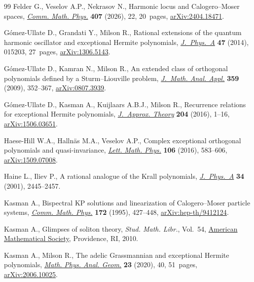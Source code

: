 \begin{thebibliography}{99}
Felder G., Veselov A.P., Nekrasov N., Harmonic locus and {C}alogero--{M}oser
 spaces, \href{https://doi.org/10.1007/s00220-025-05522-z}{\textit{Comm. Math.
 Phys.}} \textbf{407} (2026), 22, 20~pages,
 \href{http://arxiv.org/abs/2404.18471}{arXiv:2404.18471}.

G\'omez-Ullate D., Grandati Y., Milson R., Rational extensions of the quantum
 harmonic oscillator and exceptional {H}ermite polynomials,
 \href{https://doi.org/10.1088/1751-8113/47/1/015203}{\textit{J.~Phys.~A}}
 \textbf{47} (2014), 015203, 27~pages,
 \href{http://arxiv.org/abs/1306.5143}{arXiv:1306.5143}.

G\'omez-Ullate D., Kamran N., Milson R., An extended class of orthogonal
 polynomials defined by a {S}turm--{L}iouville problem,
 \href{https://doi.org/10.1016/j.jmaa.2009.05.052}{\textit{J.~Math. Anal.
 Appl.}} \textbf{359} (2009), 352--367,
 \href{http://arxiv.org/abs/0807.3939}{arXiv:0807.3939}.

G\'omez-Ullate D., Kasman A., Kuijlaars A.B.J., Milson R., Recurrence relations
 for exceptional {H}ermite polynomials,
 \href{https://doi.org/10.1016/j.jat.2015.12.003}{\textit{J.~Approx. Theory}}
 \textbf{204} (2016), 1--16,
 \href{http://arxiv.org/abs/1506.03651}{arXiv:1506.03651}.

Haese-Hill W.A., Halln\"as M.A., Veselov A.P., Complex exceptional orthogonal
 polynomials and quasi-invariance,
 \href{https://doi.org/10.1007/s11005-016-0828-8}{\textit{Lett. Math. Phys.}}
 \textbf{106} (2016), 583--606,
 \href{http://arxiv.org/abs/1509.07008}{arXiv:1509.07008}.

Haine L., Iliev P., A rational analogue of the {K}rall polynomials,
\href{https://doi.org/10.1088/0305-4470/34/11/333}{\textit{J.~Phys.~A}} \textbf{34} (2001), 2445--2457.

Kasman A., Bispectral {KP} solutions and linearization of {C}alogero--{M}oser
 particle systems, \href{https://doi.org/10.1007/BF02099435}{\textit{Comm.
 Math. Phys.}} \textbf{172} (1995), 427--448,
 \href{http://arxiv.org/abs/hep-th/9412124}{arXiv:hep-th/9412124}.

Kasman A., Glimpses of soliton theory, \textit{Stud. Math. Libr.}, Vol.~54,
 \href{https://doi.org/10.1090/stml/054}{American Mathematical Society},
 Providence, RI, 2010.

Kasman A., Milson R., The adelic {G}rassmannian and exceptional {H}ermite
 polynomials, \href{https://doi.org/10.1007/s11040-020-09365-z}{\textit{Math.
 Phys. Anal. Geom.}} \textbf{23} (2020), 40, 51~pages,
 \href{http://arxiv.org/abs/2006.10025}{arXiv:2006.10025}.


\end{thebibliography}
